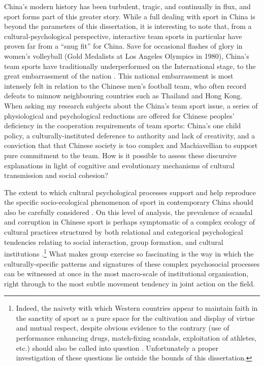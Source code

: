 China's modern history has been turbulent, tragic, and continually in flux, and sport forms part of this greater story.  While a full dealing with sport in China is beyond the parameters of this dissertation, it is interesting to note that, from a cultural-psychological perspective, interactive team sports in particular have proven far from a ``snug fit'' for China.  Save for occasional flashes of glory in women's volleyball (Gold Medalists at Los Angeles Olympics in 1980), China's team sports have traditionally underperformed on the International stage, to the great embarrassment of the nation \citep{Brownell2008}.  This national embarrassment is most intensely felt in relation to the Chinese men's football team, who often record defeats to minnow neighbouring countries such as Thailand and Hong Kong. When asking my research subjects about the China's team sport issue, a series of physiological and psychological reductions are offered for Chinese peoples' deficiency in the cooperation requirements of team sports: China's one child policy, a culturally-instituted deference to authority and lack of creativity, and a conviction that that Chinese society is too complex and Machiavellian to support pure commitment to the team.  How is it possible to assess these discursive explanations in light of cognitive and evolutionary mechanisms of cultural transmission and social cohesion?

The extent to which cultural psychological processes support and help reproduce the specific socio-ecological phenomenon of sport in contemporary China should also be carefully considered \citep{Sperber1996,Nisbett2003}.  On this level of analysis, the prevalence of scandal and corruption in Chinese sport is perhaps symptomatic of a complex ecology of cultural practices structured by both relational and categorical psychological tendencies relating to social interaction, group formation, and cultural institutions \citep{Nisbett2003,Yuki2005,Liu2009}.\footnote{Indeed, the naivety with which Western countries appear to maintain faith in the sanctity of sport as a pure space for the cultivation and display of virtue and mutual respect, despite obvious evidence to the contrary (use of performance enhancing drugs, match-fixing scandals, exploitation of athletes, etc.) should also be called into question \citep{Southall2017}.  Unfortunately a proper investigation of these questions lie outside the bounds of this dissertation.} What makes group exercise so fascinating is the way in which the culturally-specific patterns and signatures of these complex psychosocial processes can be witnessed at once in the most macro-scale of institutional organisation, right through to the most subtle movement tendency in joint action on the field.


